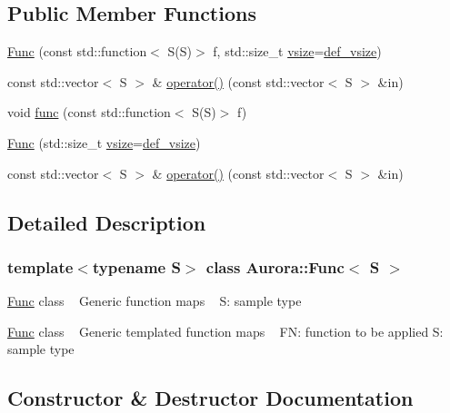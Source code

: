 \subsection*{Public Member Functions}
\begin{DoxyCompactItemize}
\item 
\hyperlink{class_aurora_1_1_func_aca7dd7976ed6205103f2775b61706c0f}{Func} (const std\+::function$<$ S(S)$>$ f, std\+::size\+\_\+t \hyperlink{class_aurora_1_1_snd_base_af9e21aaf411b17f7a8221c991ce5d291}{vsize}=\hyperlink{namespace_aurora_afaaddf667a06e7ce23c667a8b7295263}{def\+\_\+vsize})
\item 
const std\+::vector$<$ S $>$ \& \hyperlink{class_aurora_1_1_func_a60e9dad421d80a9f9eb99cfbac104729}{operator()} (const std\+::vector$<$ S $>$ \&in)
\item 
void \hyperlink{class_aurora_1_1_func_ad0b316fc635de73ddcd75f97293c10d9}{func} (const std\+::function$<$ S(S)$>$ f)
\item 
\hyperlink{class_aurora_1_1_func_a43642517fd146a27c689f570ddd46c1e}{Func} (std\+::size\+\_\+t \hyperlink{class_aurora_1_1_snd_base_af9e21aaf411b17f7a8221c991ce5d291}{vsize}=\hyperlink{namespace_aurora_afaaddf667a06e7ce23c667a8b7295263}{def\+\_\+vsize})
\item 
const std\+::vector$<$ S $>$ \& \hyperlink{class_aurora_1_1_func_a60e9dad421d80a9f9eb99cfbac104729}{operator()} (const std\+::vector$<$ S $>$ \&in)
\end{DoxyCompactItemize}


\subsection{Detailed Description}
\subsubsection*{template$<$typename S$>$\newline
class Aurora\+::\+Func$<$ S $>$}

\hyperlink{class_aurora_1_1_func}{Func} class ~\newline
Generic function maps ~\newline
S\+: sample type

\hyperlink{class_aurora_1_1_func}{Func} class ~\newline
Generic templated function maps ~\newline
FN\+: function to be applied S\+: sample type 

\subsection{Constructor \& Destructor Documentation}
\mbox{\label{class_aurora_1_1_func_aca7dd7976ed6205103f2775b61706c0f}} 
